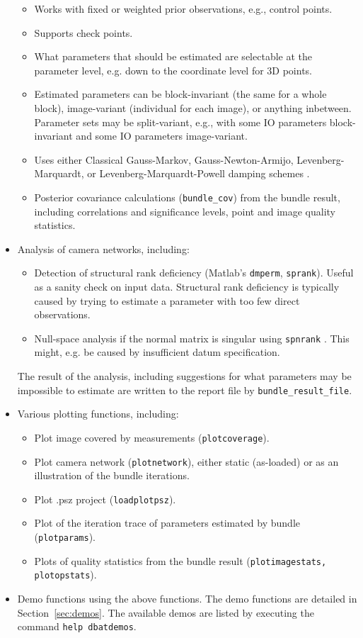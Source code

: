\documentclass{article}
\begin{document}
\begin{itemize}
\begin{itemize}
  \item Works with fixed or weighted prior observations, e.g., control
    points.
  \item Supports check points.
  \item What parameters that should be estimated are selectable at the
    parameter level, e.g. down to the coordinate level for 3D points.
  \item Estimated parameters can be block-invariant (the same for a
    whole block), image-variant (individual for each image), or
    anything inbetween. Parameter sets may be split-variant, e.g.,
    with some IO parameters block-invariant and some IO parameters
    image-variant.
  \item Uses either Classical Gauss-Markov, Gauss-Newton-Armijo,
    Levenberg-Marquardt, or Levenberg-Marquardt-Powell damping schemes
    \citep{Borlin2013:Bundle,Borlin2014:Camera,Borlin2016:External}.
  \item Posterior covariance calculations (\texttt{bundle\_cov}) from
    the bundle result, including correlations and significance levels,
    point and image quality statistics.
  \end{itemize}
\item Analysis of camera networks, including:
  \begin{itemize}
  \item Detection of structural rank deficiency (Matlab's
    \texttt{dmperm}, \texttt{sprank}). Useful as a sanity check on
    input data. Structural rank deficiency is typically caused by
    trying to estimate a parameter with too few direct observations.
  \item Null-space analysis if the normal matrix is singular using
    \texttt{spnrank} \citep{Foster2009:Calculating}. This might, e.g.
    be caused by insufficient datum specification.
  \end{itemize}
  The result of the analysis, including suggestions for what
  parameters may be impossible to estimate are written to the report
  file by \texttt{bundle\_result\_file}.
\item Various plotting functions, including:
  \begin{itemize}
  \item Plot image covered by measurements
    (\texttt{plotcoverage}).
  \item Plot camera network (\texttt{plotnetwork}), either static
    (as-loaded) or as an illustration of the bundle iterations.
  \item Plot .psz project (\texttt{loadplotpsz}).
  \item Plot of the iteration trace of parameters estimated by bundle
    (\texttt{plotparams}).
  \item Plots of quality statistics from the bundle result
    (\texttt{plotimagestats, plotopstats}).
  \end{itemize}
\item Demo functions using the above functions. The demo functions are
  detailed in Section~\ref{sec:demos}. The available demos are listed
  by executing the command \texttt{help dbatdemos}.
\end{itemize}
\end{document}
